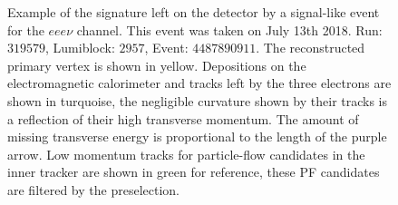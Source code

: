 \begin{figure}
  \centering
  \vfil
  \caption{Example of the signature left on the detector by a signal-like event
    for the $eee\nu$ channel. This event was taken on July 13th 2018. Run: $319579$,
    Lumiblock: $2957$, Event: $4487890911$. The reconstructed primary vertex is shown in yellow.
    Depositions on the electromagnetic calorimeter and tracks left by the three electrons
    are shown in turquoise, the negligible curvature
    shown by their tracks is a reflection of their high transverse momentum.
    The amount of missing transverse energy is proportional to the length of the purple arrow. Low momentum
    tracks for particle-flow candidates in the inner tracker are shown in green for
    reference, these PF candidates are filtered by the preselection. }
  \label{fig:Fireworks_eeev}
\end{figure}


